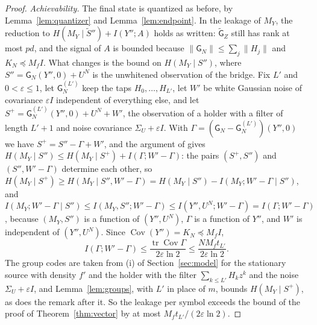 \documentclass[11pt,onecolumn]{IEEEtran}
\newcommand{\tr}{\operatorname{tr}}
\newcommand{\Cov}{\operatorname{Cov}}
\begin{document}
\begin{proof}
\emph{Achievability.} The final state is quantized as before, by
Lemma~\ref{lem:quantizer} and Lemma~\ref{lem:endpoint}. In the leakage of
$M_Y$, the reduction to $H(M_Y\mid\tilde S'')+I(Y'';A)$ holds as written:
$\tilde{\mathsf G}_Z$ still has rank at most $pd$, and the signal of $A$ is
bounded because $\|\mathsf G_N\|\le\sum_j\|H_j\|$ and $K_N\preceq M_fI$.
What changes is the bound on $H(M_Y\mid S'')$, where
$S''=\mathsf G_N(Y'',0)+U^N$ is the unwhitened observation of the bridge.
Fix $L'$ and $0<\varepsilon\le1$, let $\mathsf G_N^{(L')}$ keep the taps
$H_0,\dots,H_{L'}$, let $W'$ be white Gaussian noise of covariance
$\varepsilon I$ independent of everything else, and let
$S^+=\mathsf G_N^{(L')}(Y'',0)+U^N+W'$, the observation of a holder with a
filter of length $L'+1$ and noise covariance $\Sigma_U+\varepsilon I$. With
$\Gamma=(\mathsf G_N-\mathsf G_N^{(L')})(Y'',0)$ we have $S^+=S''-\Gamma+W'$,
and the argument of \cite[proof of Theorem~22]{part2} gives
$H(M_Y\mid S'')\le H(M_Y\mid S^+)+I(\Gamma;W'-\Gamma)$: the pairs $(S^+,S'')$
and $(S'',W'-\Gamma)$ determine each other, so
$H(M_Y\mid S^+)\ge H(M_Y\mid S'',W'-\Gamma)=H(M_Y\mid S'')-I(M_Y;W'-\Gamma\mid S'')$,
and
$I(M_Y;W'-\Gamma\mid S'')\le I(M_Y,S'';W'-\Gamma)\le I(Y'',U^N;W'-\Gamma)=I(\Gamma;W'-\Gamma)$,
because $(M_Y,S'')$ is a function of $(Y'',U^N)$, $\Gamma$ is a function of
$Y''$, and $W'$ is independent of $(Y'',U^N)$.
Since $\Cov(Y'')=K_N\preceq M_fI$,
\[
I(\Gamma;W'-\Gamma)\le\frac{\tr\Cov\Gamma}{2\varepsilon\ln2}\le\frac{NM_ft_{L'}}{2\varepsilon\ln2}.
\]
The group codes are taken from (i) of Section~\ref{sec:model} for the
stationary source with density $f'$ and the holder with the filter
$\sum_{k\le L'}H_kz^k$ and the noise $\Sigma_U+\varepsilon I$, and
Lemma~\ref{lem:groups}, with $L'$ in place of $m$, bounds
$H(M_Y\mid S^+)$, as does the remark after it. So the leakage per symbol
exceeds the bound of the proof of Theorem~\ref{thm:vector} by at most
$M_ft_{L'}/(2\varepsilon\ln2)$.


\end{proof}
\end{document}
